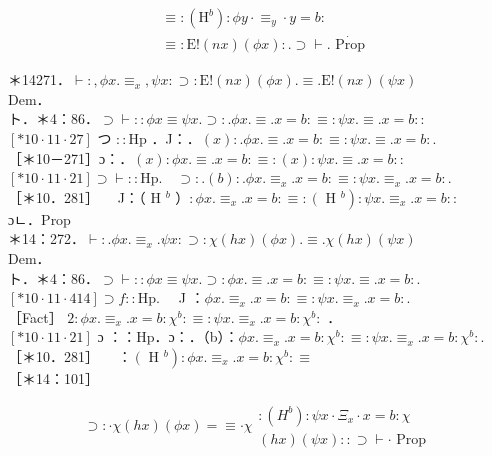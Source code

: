 \documentclass[10pt]{article}
\begin{document}
$$
\begin{aligned}
& \equiv:\left(\mathrm{H}^{b}\right): \phi y \cdot \equiv_{y} \cdot y=b: \\
& \equiv: \mathrm{E}!(n x)(\phi x): . \supset \vdash . \dot{\text { Prop }}
\end{aligned}
$$

＊14271．$\vdash:, \phi x . \equiv_{x}, \psi x: \supset: \mathrm{E}!(n x)(\phi x) . \equiv . \mathrm{E}!(n x)(\psi x)$\\
Dem．\\
ト．＊4：86．$\supset \vdash:: \phi x \equiv \psi x . \supset: . \phi x . \equiv . x=b: \equiv: \psi x . \equiv . x=b::$\\
$[* 10 \cdot 11 \cdot 27]$ つ $:: \mathrm{Hp}$ ．J：．$(x): . \phi x . \equiv . x=b: \equiv: \psi x . \equiv . x=b:$.\\
［＊10－271］ɔ：．$(x): \phi x . \equiv . x=b: \equiv:(x): \psi x . \equiv . x=b::$\\
$[* 10 \cdot 11 \cdot 21] \supset \vdash:: \mathrm{Hp} . \quad \supset: .(b): . \phi x . \equiv_{x} . x=b: \equiv: \psi x . \equiv_{x} . x=b:$.\\
［＊10．281］$\quad$ J：（ H $^{b}$ ）$: \phi x . \equiv_{x} . x=b: \equiv:\left(\right.$ H $\left.^{b}\right): \psi x . \equiv_{x} . x=b::$\\
ɔㄴ．Prop\\
＊14：272．$\vdash: . \phi x . \equiv_{x} . \psi x: \supset: \chi(h x)(\phi x) . \equiv . \chi(h x)(\psi x)$\\
Dem．\\
ト．＊4：86．$\supset \vdash:: \phi x \equiv \psi x . \supset: \phi x . \equiv . x=b: \equiv: \psi x . \equiv . x=b:$.\\
$[* 10 \cdot 11 \cdot 414] \supset f:: \mathrm{Hp} . \quad$ J ：$\phi x . \equiv_{x} . x=b: \equiv: \psi x . \equiv_{x} . x=b:$.\\
［Fact］ $2: \phi x . \equiv_{x} . x=b: \chi^{b}: \equiv: \psi x . \equiv_{x} . x=b: \chi^{b}:$ ．\\
$[* 10 \cdot 11 \cdot 21]$ ɔ ：：Hp．ɔ：．（b）：$\phi x . \equiv_{x} . x=b: \chi^{b}: \equiv: \psi x . \equiv_{x} . x=b: \chi^{b}:$.\\
［＊10．281］$\quad$ ：$\left(\right.$ H $\left.^{b}\right): \phi x . \equiv_{x} . x=b: \chi^{b}: \equiv$\\
［＊14：101］

$$
\supset: \cdot \chi(h x)(\phi x)=\equiv \cdot \chi \begin{gathered}
:\left(H^{b}\right): \psi x \cdot \Xi_{x} \cdot x=b: \chi \\
(h x)(\psi x):: \supset \vdash \cdot \text { Prop }
\end{gathered}
$$
\end{document}
